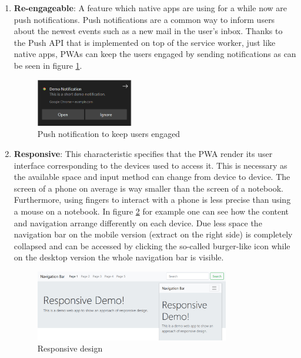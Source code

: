 \begin{enumerate}
	\item \textbf{Re-engageable}: A feature which native apps are using for a while now are push notifications. Push notifications are a common way to inform users about the newest events such as a new mail in the user’s inbox. Thanks to the Push API that is implemented on top of the service worker, just like native apps, PWAs can keep the users engaged by sending notifications as can be seen in figure \ref{fig:pwa_reengageable}. \cite[p. 201]{hajianProgressiveWebApps2019}

\begin{figure}[htbp] 
	\centering
	\includegraphics[width=0.4\textwidth]{Assets/chapter_pwa/demonotification.PNG}
	\caption{Push notification to keep users engaged}
	\label{fig:pwa_reengageable}
\end{figure}

	\item \textbf{Responsive}: This characteristic specifies that the PWA render its user interface corresponding to the devices used to access it. This is necessary as the available space and input method can change from device to device. The screen of a phone on average is way smaller than the screen of a notebook. Furthermore, using fingers to interact with a phone is less precise than using a mouse on a notebook. \cite[pp. 115-116]{liebelProgressiveWebApps2019} In figure \ref{fig:pwa_responsive} for example one can see how the content and navigation arrange differently on each device. Due less space the navigation bar on the mobile version (extract on the right side) is completely collapsed and can be accessed by clicking the so-called burger-like icon while on the desktop version the whole navigation bar is visible.

\begin{figure}[htbp] 
	\centering
	\includegraphics[width=0.8\textwidth]{Assets/chapter_pwa/responsive-overall.jpg}
	\caption{Responsive design}
	\label{fig:pwa_responsive}
\end{figure}


\end{enumerate}
